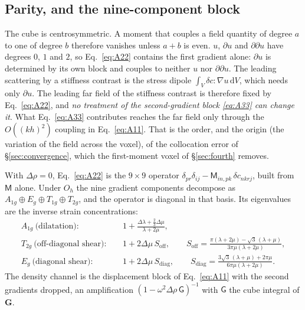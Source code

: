 \documentclass[extra,mreferee]{gji}
\newcommand{\bG}{\mathbf{G}}
\begin{document}
\subsection{Parity, and the nine-component block}\label{sec:parity}

The cube is centrosymmetric. A moment that couples a field quantity of degree $a$ to one of degree
$b$ therefore vanishes unless $a+b$ is even. $u$, $\partial u$ and $\partial\partial u$ have
degrees $0$, $1$ and $2$, so Eq.~\eqref{eq:A22} contains the first gradient alone: $\partial u$
is determined by its own block and couples to neither $u$ nor $\partial\partial u$. The leading
scattering by a stiffness contrast is the stress dipole $\int_V\delta c:\nabla u\,\mathrm{d}V$, which needs
only $\partial u$. The leading far field of the stiffness contrast is therefore fixed by
Eq.~\eqref{eq:A22}, and \emph{no treatment of the second-gradient block \eqref{eq:A33} can change
it}. What Eq.~\eqref{eq:A33} contributes reaches the far field only through the $O((kh)^2)$
coupling in Eq.~\eqref{eq:A11}. That is the order, and the origin (the variation of the field
across the voxel), of the collocation error of \S\ref{sec:convergence}, which the first-moment
voxel of \S\ref{sec:fourth} removes.

With $\Delta\rho=0$, Eq.~\eqref{eq:A22} is the $9\times9$ operator
$\delta_{pr}\delta_{ij}-\mathsf M_{in,pk}\,\delta c_{nkrj}$, built from $\mathsf M$ alone. Under
$O_h$ the nine gradient components decompose as $A_{1g}\oplus E_g\oplus T_{1g}\oplus T_{2g}$, and
the operator is diagonal in that basis. Its eigenvalues are the inverse strain concentrations:
\begin{align}
A_{1g}\ \text{(dilatation)}:&\quad 1+\frac{\Delta\lambda+\tfrac23\Delta\mu}{\lambda+2\mu},
  \label{eq:A1g}\\
T_{2g}\ \text{(off-diagonal shear)}:&\quad 1+2\Delta\mu\,S_{\text{off}},\qquad
  S_{\text{off}}=\frac{\pi(\lambda+2\mu)-\sqrt3\,(\lambda+\mu)}{3\pi\mu(\lambda+2\mu)},
  \label{eq:T2g}\\
E_{g}\ \text{(diagonal shear)}:&\quad 1+2\Delta\mu\,S_{\text{diag}},\qquad
  S_{\text{diag}}=\frac{3\sqrt3\,(\lambda+\mu)+2\pi\mu}{6\pi\mu(\lambda+2\mu)}.
  \label{eq:Eg}
\end{align}
The density channel is the displacement block of Eq.~\eqref{eq:A11} with the second gradients
dropped, an amplification $(1-\omega^2\Delta\rho\,\mathsf G)^{-1}$ with $\mathsf G$ the cube
integral of $\bG$.
\end{document}

